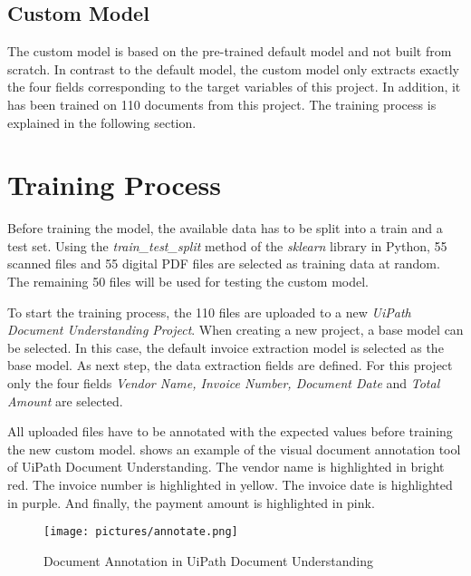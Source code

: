 \subsection*{Custom Model}
The custom model is based on the pre-trained default model and not built from scratch. In contrast to the default model, the custom model only extracts exactly the four fields corresponding to the target variables of this project. In addition, it has been trained on 110 documents from this project. The training process is explained in the following section.

\newpage
\section{Training Process}

Before training the model, the available data has to be split into a train and a test set. Using the \textit{train\_test\_split} method of the \textit{sklearn} library in Python, 55 scanned files and 55 digital PDF files are selected as training data at random. The remaining 50 files will be used for testing the custom model.

To start the training process, the 110 files are uploaded to a new \textit{UiPath Document Understanding Project}. When creating a new project, a base model can be selected. In this case, the default invoice extraction model is selected as the base model. As next step, the data extraction fields are defined. For this project only the four fields \textit{Vendor Name, Invoice Number, Document Date} and \textit{Total Amount} are selected.

All uploaded files have to be annotated with the expected values before training the new custom model.
 shows an example of the visual document annotation tool of UiPath Document Understanding. The vendor name is highlighted in bright red. The invoice number is highlighted in yellow. The invoice date is highlighted in purple. And finally, the payment amount is highlighted in pink.

\begin{figure}[ht]
    \centering
    \texttt{[image: pictures/annotate.png]}
    \caption{Document Annotation in UiPath Document Understanding}
    \label{fig:annotate}
\end{figure}

